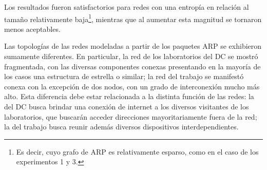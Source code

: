 \par Los resultados fueron satisfactorios para redes con una entropía en relación al tamaño relativamente baja\footnote{Es decir, cuyo grafo de ARP es relativamente esparso, como en el caso de los experimentos 1 y 3.}, mientras que al aumentar esta magnitud se tornaron menos aceptables.

\par Las topologías de las redes modeladas a partir de los paquetes ARP se exhibieron sumamente diferentes.
En particular, la red de los laboratorios del DC se mostró fragmentada, con las diversas componentes conexas presentando en la mayoría de los casos una estructura de estrella o similar; la red del trabajo se manifestó conexa con la excepción de dos nodos, con un grado de interconexión mucho más alto.
Esta diferencia debe estar relacionada a la distinta función de las redes: la del DC busca brindar una conexión de internet a los diversos visitantes de los laboratorios, que buscarán acceder direcciones mayoritariamente fuera de la red; la del trabajo busca reunir además diversos dispositivos interdependientes.
